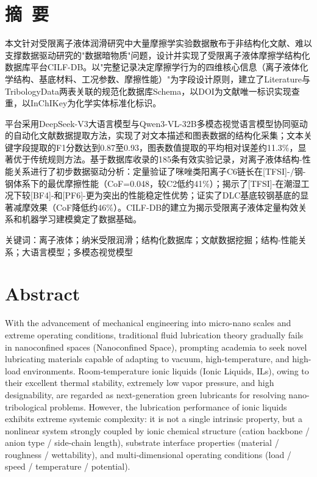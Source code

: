 \clearpage
\section*{摘\ 要}

本文针对受限离子液体润滑研究中大量摩擦学实验数据散布于非结构化文献、难以支撑数据驱动研究的"数据暗物质"问题，设计并实现了受限离子液体摩擦学结构化数据库平台CILF-DB。以"完整记录决定摩擦学行为的四维核心信息（离子液体化学结构、基底材料、工况参数、摩擦性能）"为字段设计原则，建立了Literature与TribologyData两表关联的规范化数据库Schema，以DOI为文献唯一标识实现查重，以InChIKey为化学实体标准化标识。

平台采用DeepSeek-V3大语言模型与Qwen3-VL-32B多模态视觉语言模型协同驱动的自动化文献数据提取方法，实现了对文本描述和图表数据的结构化采集；文本关键字段提取的F1分数达到0.87至0.93，图表数值提取的平均相对误差约11.3\%，显著优于传统规则方法。基于数据库收录的185条有效实验记录，对离子液体结构-性能关系进行了初步数据驱动分析：定量验证了咪唑类阳离子C6链长在{[}TFSI{]}-/钢-钢体系下的最优摩擦性能（CoF=0.048，较C2低约41\%）；揭示了{[}TFSI{]}-在潮湿工况下较{[}BF4{]}-和{[}PF6{]}-更为突出的性能稳定性优势；证实了DLC基底较钢基底的显著减摩效果（CoF降低约46\%）。CILF-DB的建立为揭示受限离子液体定量构效关系和机器学习建模奠定了数据基础。

关键词：离子液体；纳米受限润滑；结构化数据库；文献数据挖掘；结构-性能关系；大语言模型；多模态视觉模型

\clearpage
\section*{Abstract}

With the advancement of mechanical engineering into micro-nano scales and extreme operating conditions, traditional fluid lubrication theory gradually fails in nanoconfined spaces (Nanoconfined Space), prompting academia to seek novel lubricating materials capable of adapting to vacuum, high-temperature, and high-load environments. Room-temperature ionic liquids (Ionic Liquids, ILs), owing to their excellent thermal stability, extremely low vapor pressure, and high designability, are regarded as next-generation green lubricants for resolving nano-tribological problems. However, the lubrication performance of ionic liquids exhibits extreme systemic complexity: it is not a single intrinsic property, but a nonlinear system strongly coupled by ionic chemical structure (cation backbone / anion type / side-chain length), substrate interface properties (material / roughness / wettability), and multi-dimensional operating conditions (load / speed / temperature / potential).

